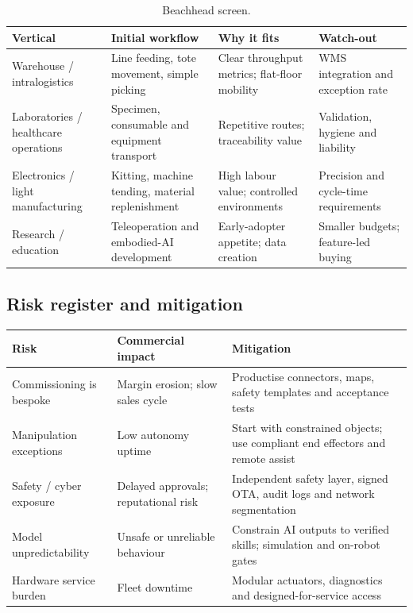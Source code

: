 \documentclass[11pt,a4paper]{article}
\begin{document}
\begin{table}[ht]
\centering\small
\caption{Beachhead screen.}
\begin{tabularx}{\textwidth}{@{}lYYY@{}}
\toprule
Vertical & Initial workflow & Why it fits & Watch-out \\
\midrule
Warehouse / intralogistics & Line feeding, tote movement, simple picking & Clear throughput metrics; flat-floor mobility & WMS integration and exception rate \\
Laboratories / healthcare operations & Specimen, consumable and equipment transport & Repetitive routes; traceability value & Validation, hygiene and liability \\
Electronics / light manufacturing & Kitting, machine tending, material replenishment & High labour value; controlled environments & Precision and cycle-time requirements \\
Research / education & Teleoperation and embodied-AI development & Early-adopter appetite; data creation & Smaller budgets; feature-led buying \\
\bottomrule
\end{tabularx}
\end{table}

\subsection{Risk register and mitigation}

\begin{table}[ht]
\centering\small
\begin{tabularx}{\textwidth}{@{}lYY@{}}
\toprule
Risk & Commercial impact & Mitigation \\
\midrule
Commissioning is bespoke & Margin erosion; slow sales cycle & Productise connectors, maps, safety templates and acceptance tests \\
Manipulation exceptions & Low autonomy uptime & Start with constrained objects; use compliant end effectors and remote assist \\
Safety / cyber exposure & Delayed approvals; reputational risk & Independent safety layer, signed OTA, audit logs and network segmentation \\
Model unpredictability & Unsafe or unreliable behaviour & Constrain AI outputs to verified skills; simulation and on-robot gates \\
Hardware service burden & Fleet downtime & Modular actuators, diagnostics and designed-for-service access \\
\bottomrule
\end{tabularx}
\end{table}
\end{document}
